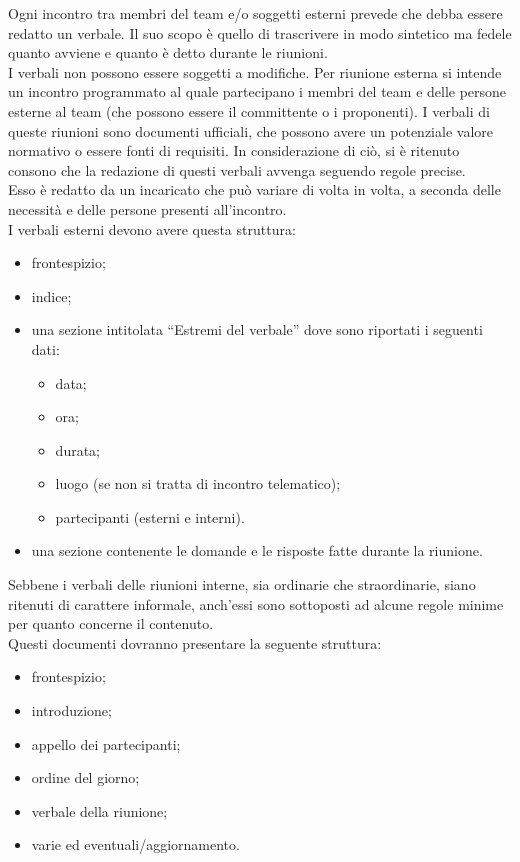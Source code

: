 				Ogni incontro tra membri del team e/o soggetti esterni prevede che debba essere redatto un verbale. Il suo scopo è quello di trascrivere in modo sintetico ma fedele quanto avviene e quanto è detto durante le riunioni.\\
				I verbali non possono essere soggetti a modifiche.
					Per riunione esterna si intende un incontro programmato al quale partecipano i membri del team e delle persone esterne al team (che possono essere il committente o i proponenti). I verbali di queste riunioni sono documenti ufficiali, che possono avere un potenziale valore normativo o essere fonti di requisiti. In considerazione di ciò, si è ritenuto consono che la redazione di questi verbali avvenga seguendo regole precise.\\
					Esso è redatto da un incaricato che può variare di volta in volta, a seconda delle necessità e delle persone presenti all’incontro.\\
					I verbali esterni devono avere questa struttura:
					\begin{itemize}
						\item frontespizio;
						\item indice;
						\item una sezione intitolata “Estremi del verbale” dove sono riportati i seguenti dati:
						\begin{itemize}
							\item data;
							\item ora;
							\item durata;
							\item luogo (se non si tratta di incontro telematico);
							\item partecipanti (esterni e interni).
						\end{itemize}
						\item una sezione contenente le domande e le risposte fatte durante la riunione.
					\end{itemize}
					Sebbene i verbali delle riunioni interne, sia ordinarie che straordinarie, siano ritenuti di carattere informale, anch'essi sono sottoposti ad alcune regole minime per quanto concerne il contenuto.  \\
					Questi documenti dovranno presentare la seguente struttura:
					\begin{itemize}
						\item frontespizio;
						\item introduzione;
						\item appello dei partecipanti;
						\item ordine del giorno;
						\item verbale della riunione;
						\item varie ed eventuali/aggiornamento.
					\end{itemize}
